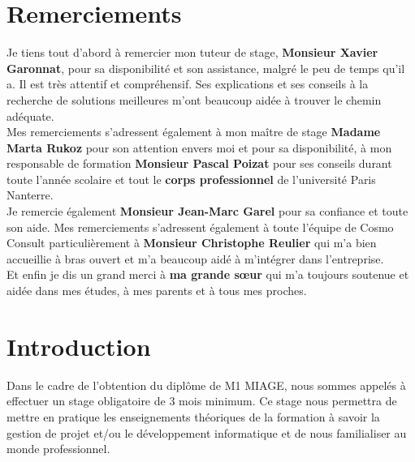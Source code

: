 \documentclass[11pt]{report}
\begin{document}
\newpage
\section{Remerciements}
\hspace{1cm} Je tiens tout d’abord à remercier mon tuteur de stage, \textbf{Monsieur Xavier Garonnat}, pour sa disponibilité et son assistance, malgré le peu de temps qu’il a. Il est très attentif et compréhensif. Ses explications et ses conseils à la recherche de solutions meilleures m’ont beaucoup aidée à trouver le chemin adéquate.\\ 

\hspace{1cm} Mes remerciements s’adressent également à mon maître de stage \textbf{Madame Marta Rukoz} pour son attention envers moi et pour sa disponibilité, à mon responsable de formation \textbf{Monsieur Pascal Poizat} pour ses conseils durant toute l’année scolaire et tout le \textbf{corps professionnel} de l’université Paris Nanterre.\\ 

\hspace{1cm} Je remercie également \textbf{Monsieur Jean-Marc Garel} pour sa confiance et toute son aide. Mes remerciements s’adressent également à toute l’équipe de Cosmo Consult particulièrement à \textbf{Monsieur Christophe Reulier} qui m’a bien accueillie à bras ouvert et m’a beaucoup aidé à m’intégrer dans l’entreprise.\\

\hspace{1cm} Et enfin je dis un grand merci à \textbf{ma grande sœur} qui m’a toujours soutenue et aidée dans mes études, à mes parents et à tous mes proches.


\newpage
\renewcommand{\contentsname}{Table des matières}
\tableofcontents
\pagebreak


\section{Introduction}
\hspace{1cm} Dans le cadre de l'obtention du diplôme de M1 MIAGE, nous sommes appelés à effectuer un stage obligatoire de 3 mois minimum. Ce stage nous permettra de mettre en pratique les enseignements théoriques de la formation à savoir la gestion de projet et/ou le développement informatique et de nous familialiser au monde professionnel.\\
 
\end{document}
